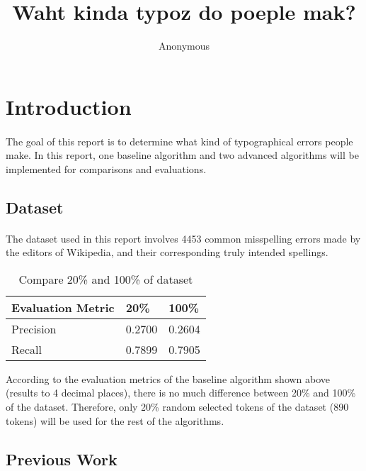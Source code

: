 \documentclass[11pt]{article}
\title{Waht kinda typoz do poeple mak?}
\author
{Anonymous}
\begin{document}
\maketitle

\section{Introduction}

\paragraph{} The goal of this report is to determine what kind of typographical errors people make. In this report, one baseline algorithm and two advanced algorithms will be implemented for comparisons and evaluations.

\subsection{Dataset}

\paragraph{} The dataset used in this report involves 4453 common misspelling errors made by the editors of Wikipedia, and their corresponding truly intended spellings.

\begin{table}[h]
 \begin{center}
\begin{tabular}{| l | l | l |}

      \hline
      Evaluation Metric & 20\% & 100\% \\
      \hline\hline
      Precision & 0.2700 & 0.2604 \\
      Recall & 0.7899 & 0.7905 \\
      \hline

\end{tabular}
\caption{Compare 20\% and 100\% of dataset}\label{table1}
 \end{center}
\end{table}

According to the evaluation metrics of the baseline algorithm shown above (results to 4 decimal places), there is no much difference between 20\% and 100\% of the dataset. Therefore, only 20\% random selected tokens of the dataset (890 tokens) will be used for the rest of the algorithms.

\subsection{Previous Work}
\end{document}
